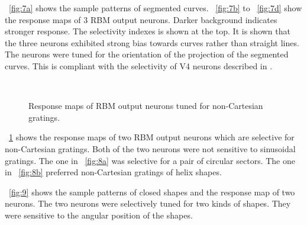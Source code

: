 \documentclass[conference]{IEEEtran}
\begin{document}
\figurename~\ref{fig:7a} shows the sample patterns of segmented curves.
\figurename~\ref{fig:7b} to \figurename~\ref{fig:7d} show the response maps of 3 RBM output neurons.
Darker background indicates stronger response.
The selectivity indexes is shown at the top.
It is shown that the three neurons exhibited strong bias towards curves rather than straight lines.
The neurons were tuned for the orientation of the projection of the segmented curves.
This is compliant with the selectivity of V4 neurons described in \cite{pasupathy1999}.

\begin{figure}[htp]
\centering
{}\\
\caption{Response maps of RBM output neurons tuned for non-Cartesian gratings.}
\label{fig:8}
\end{figure}

\figurename~\ref{fig:8} shows the response maps of two RBM output neurons
which are selective for non-Cartesian gratings.
Both of the two neurons were not sensitive to sinusoidal gratings.
The one in \figurename~\ref{fig:8a} was selective for a pair of circular sectors.
The one in \figurename~\ref{fig:8b} preferred non-Cartesian gratings of helix shapes.

\figurename~\ref{fig:9} shows the sample patterns of closed shapes and the response map of two neurons.
The two neurons were selectively tuned for two kinds of shapes.
They were sensitive to the angular position of the shapes.
\end{document}

